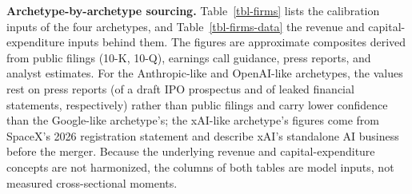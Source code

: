 \documentclass[
  11pt,
  letterpaper,
]{scrartcl}
\begin{document}
\textbf{Archetype-by-archetype sourcing.} Table~\ref{tbl-firms} lists
the calibration inputs of the four archetypes, and
Table~\ref{tbl-firms-data} the revenue and capital-expenditure inputs
behind them. The figures are approximate composites derived from public
filings (10-K, 10-Q), earnings call guidance, press reports, and analyst
estimates. For the Anthropic-like and OpenAI-like archetypes, the values
rest on press reports (of a draft IPO prospectus and of leaked financial
statements, respectively) rather than public filings and carry lower
confidence than the Google-like archetype's; the xAI-like archetype's
figures come from SpaceX's 2026 registration statement and describe
xAI's standalone AI business before the merger. Because the underlying
revenue and capital-expenditure concepts are not harmonized, the columns
of both tables are model inputs, not measured cross-sectional moments.
\end{document}
